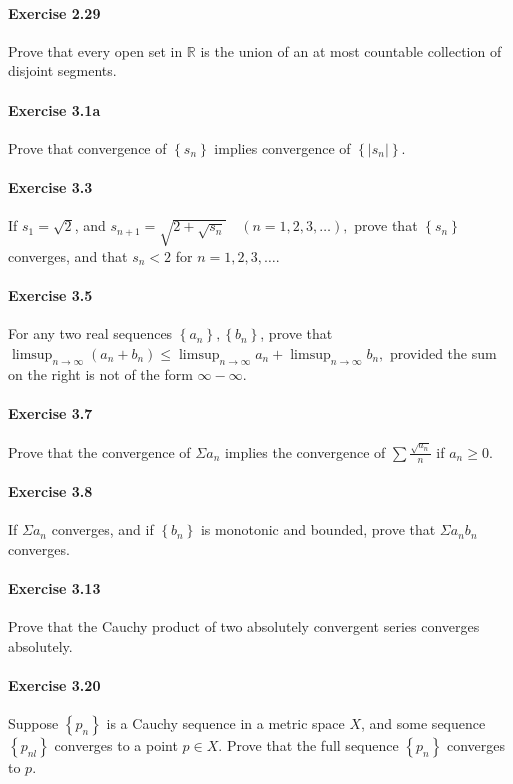 \documentclass{article}
\begin{document}
\paragraph{Exercise 2.29} Prove that every open set in $\mathbb{R}$ is the union of an at most countable collection of disjoint segments.

\paragraph{Exercise 3.1a} Prove that convergence of $\left\{s_{n}\right\}$ implies convergence of $\left\{\left|s_{n}\right|\right\}$.

\paragraph{Exercise 3.3} If $s_{1}=\sqrt{2}$, and $s_{n+1}=\sqrt{2+\sqrt{s_{n}}} \quad(n=1,2,3, \ldots),$ prove that $\left\{s_{n}\right\}$ converges, and that $s_{n}<2$ for $n=1,2,3, \ldots$.

\paragraph{Exercise 3.5} For any two real sequences $\left\{a_{n}\right\},\left\{b_{n}\right\}$, prove that $\limsup _{n \rightarrow \infty}\left(a_{n}+b_{n}\right) \leq \limsup _{n \rightarrow \infty} a_{n}+\limsup _{n \rightarrow \infty} b_{n},$ provided the sum on the right is not of the form $\infty-\infty$.

\paragraph{Exercise 3.7} Prove that the convergence of $\Sigma a_{n}$ implies the convergence of $\sum \frac{\sqrt{a_{n}}}{n}$ if $a_n\geq 0$.

\paragraph{Exercise 3.8} If $\Sigma a_{n}$ converges, and if $\left\{b_{n}\right\}$ is monotonic and bounded, prove that $\Sigma a_{n} b_{n}$ converges.

\paragraph{Exercise 3.13} Prove that the Cauchy product of two absolutely convergent series converges absolutely.

\paragraph{Exercise 3.20} Suppose $\left\{p_{n}\right\}$ is a Cauchy sequence in a metric space $X$, and some sequence $\left\{p_{n l}\right\}$ converges to a point $p \in X$. Prove that the full sequence $\left\{p_{n}\right\}$ converges to $p$.
\end{document}
